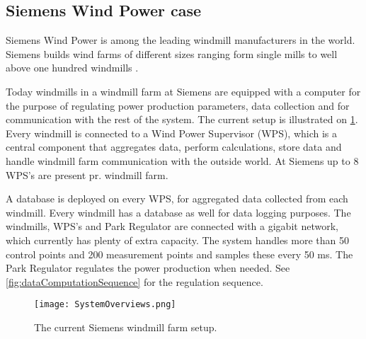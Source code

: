 \subsection{Siemens Wind Power case}
\label{sec:SiemensCase}
Siemens Wind Power is among the leading windmill manufacturers in the world. Siemens builds wind farms of different sizes ranging form single mills to well above one hundred windmills \cite{simensOffShoreProjects, simensOnShoreProjects}.

Today windmills in a windmill farm at Siemens are equipped with a computer for the purpose of regulating power production parameters, data collection and for communication with the rest of the system. The current setup is illustrated on \cref{fig:currentSiemensSetup}. Every windmill is connected to a Wind Power Supervisor (WPS), which is a central component that aggregates data, perform calculations, store data and handle windmill farm communication with the outside world. At Siemens up to 8 WPS's are present pr. windmill farm.

A database is deployed on every WPS, for aggregated data collected from each windmill. Every windmill has a database as well for data logging purposes. The windmills, WPS's and Park Regulator are connected with a gigabit network, which currently has plenty of extra capacity. The system handles more than 50 control points and 200 measurement points and samples these every 50 ms. The Park Regulator regulates the power production when needed. See \cref{fig:dataComputationSequence} for the regulation sequence.

\begin{figure}
	\centering
	\texttt{[image: SystemOverviews.png]} 
	\caption[Illustrates the current Siemens windmill farm setup]{
		\label{fig:currentSiemensSetup} 
		\footnotesize{%
			The current Siemens windmill farm setup.
		}
	}
\end{figure}


